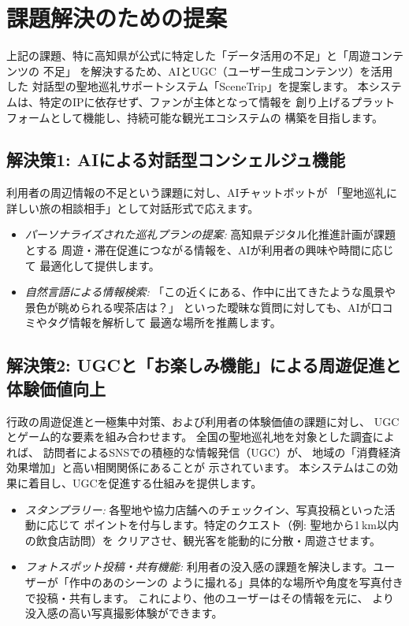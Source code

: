 \documentclass{docs}
\begin{document}
\section{課題解決のための提案}
上記の課題、特に高知県が公式に特定した「データ活用の不足」と「周遊コンテンツの
不足」\cite{kochi_dx_plan}
を解決するため、AIとUGC（ユーザー生成コンテンツ）を活用した
対話型の聖地巡礼サポートシステム「SceneTrip」を提案します。
本システムは、特定のIPに依存せず、ファンが主体となって情報を
創り上げるプラットフォームとして機能し、持続可能な観光エコシステムの
構築を目指します。

\subsection{解決策1: AIによる対話型コンシェルジュ機能}
利用者の周辺情報の不足という課題に対し、AIチャットボットが
「聖地巡礼に詳しい旅の相談相手」として対話形式で応えます。
\begin{itemize}
	\item \emph{パーソナライズされた巡礼プランの提案:}
	高知県デジタル化推進計画\cite{kochi_dx_plan}が課題とする
	周遊・滞在促進につながる情報を、AIが利用者の興味や時間に応じて
	最適化して提供します。
	\item \emph{自然言語による情報検索:}
	「この近くにある、作中に出てきたような風景や景色が眺められる喫茶店は？」
	といった曖昧な質問に対しても、AIが口コミやタグ情報を解析して
	最適な場所を推薦します。
\end{itemize}

\subsection{解決策2: UGCと「お楽しみ機能」による周遊促進と体験価値向上}
行政の周遊促進と一極集中対策、および利用者の体験価値の課題に対し、
UGCとゲーム的な要素を組み合わせます。
全国の聖地巡礼地を対象とした調査によれば、
訪問者によるSNSでの積極的な情報発信（UGC）が、
地域の「消費経済効果増加」と高い相関関係にあることが
示されています\cite{noda2022}。
本システムはこの効果に着目し、UGCを促進する仕組みを提供します。
\begin{itemize}
	\item \emph{スタンプラリー:}
	各聖地や協力店舗へのチェックイン、写真投稿といった活動に応じて
	ポイントを付与します。特定のクエスト（例: 聖地から1\,km以内の飲食店訪問）を
	クリアさせ、観光客を能動的に分散・周遊させます。
	\item \emph{フォトスポット投稿・共有機能:}
	利用者の没入感の課題を解決します。ユーザーが「作中のあのシーンの
	ように撮れる」具体的な場所や角度を写真付きで投稿・共有します。
	これにより、他のユーザーはその情報を元に、
	より没入感の高い写真撮影体験ができます。
\end{itemize}
\end{document}
